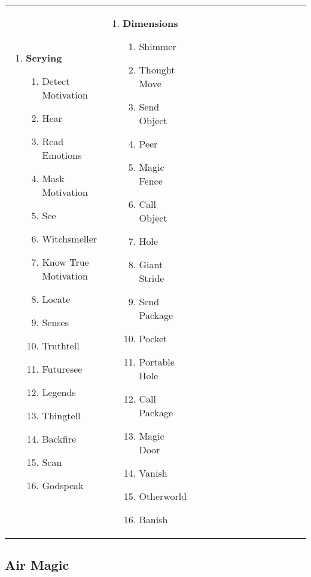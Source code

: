 \begin{tabular}{@{} p{0.25\linewidth} p{0.25\linewidth} p{0.25\linewidth} p{0.25\linewidth}}
\begin{enumerate}
	\item \textbf{Scrying}
	\begin{enumerate}
		\item Detect Motivation
		\item Hear
		\item Read Emotions
		\item Mask Motivation
		\item See
		\item Witchsmeller
		\item Know True Motivation
		\item Locate
		\item Senses
		\item Truthtell
		\item Futuresee
		\item Legends
		\item Thingtell
		\item Backfire
		\item Scan
		\item Godspeak
	\end{enumerate}
\end{enumerate} &
\begin{enumerate}
	\item \textbf{Dimensions}
	\begin{enumerate}
		\item Shimmer
		\item Thought Move
		\item Send Object
		\item Peer
		\item Magic Fence
		\item Call Object
		\item Hole
		\item Giant Stride
		\item Send Package
		\item Pocket
		\item Portable Hole
		\item Call Package
		\item Magic Door
		\item Vanish
		\item Otherworld
		\item Banish
	\end{enumerate}
\end{enumerate} \\
\end{tabular}
\pagebreak
\subsection{Air Magic}

